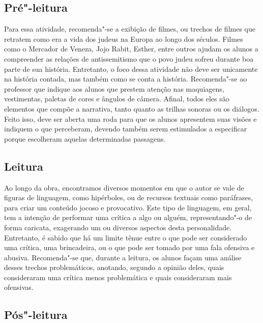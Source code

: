 \documentclass[12pt]{extarticle}
\begin{document}
\subsection{Pré"-leitura}


Para essa atividade, recomenda"-se a exibição de filmes, ou
trechos de filmes que retratem como era a vida dos judeus na Europa ao
longo dos séculos. Filmes como o Mercador de Veneza, Jojo Rabit, Esther,
entre outros ajudam os alunos a compreender as relações de
antissemitismo que o povo judeu sofreu durante boa parte de sua
história. Entretanto, o foco dessa atividade não deve ser unicamente na
história contada, mas também como se conta a história. Recomenda"-se ao
professor que indique aos alunos que prestem atenção nas maquiagens,
vestimentas, paletas de cores e ângulos de câmera. Afinal, todos eles
são elementos que compõe a narrativa, tanto quanto as trilhas sonoras ou
os diálogos. Feito isso, deve ser aberta uma roda para que os alunos
apresentem suas visões e indiquem o que perceberam, devendo também serem
estimulados a especificar porque escolheram aquelas determinadas
passagens.

\subsection{Leitura}


Ao longo da obra, encontramos diversos momentos em que o
autor se vale de figuras de linguagem, como hipérboles, ou de recursos
textuais como paráfrases, para criar um conteúdo jocoso e provocativo.
Este tipo de linguagem, em geral, tem a intenção de performar uma
crítica a algo ou alguém, representando"-o de forma caricata, exagerando
um ou diversos aspectos desta personalidade. Entretanto, é sabido que há
um limite tênue entre o que pode ser considerado uma crítica, uma
brincadeira, ou o que pode ser tomado por uma fala ofensiva e abusiva.
Recomenda"-se que, durante a leitura, os alunos façam uma análise desses
trechos problemáticos, anotando, segundo a opinião deles, quais
consideraram uma crítica menos problemática e quais consideraram mais
ofensivas.

\subsection{Pós"-leitura}
\end{document}
